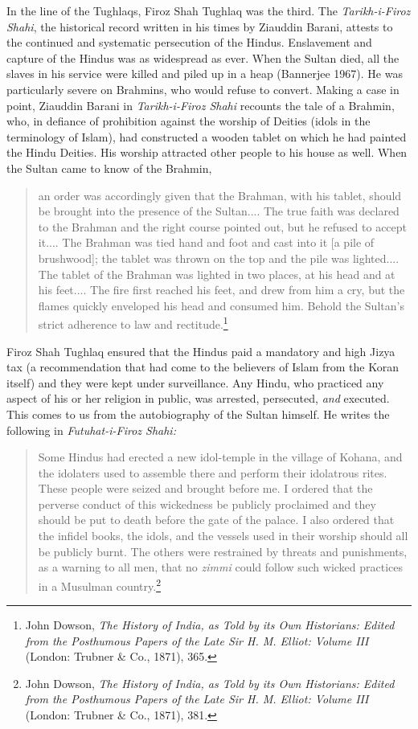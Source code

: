In the line of the Tughlaqs, Firoz Shah Tughlaq was the third. The \textit{Tarikh-i-Firoz Shahi}, the historical record written in his times by Ziauddin Barani, attests to the continued and systematic persecution of the Hindus. Enslavement and capture of the Hindus was as widespread as ever. When the Sultan died, all the slaves in his service were killed and piled up in a heap (Bannerjee 1967). He was particularly severe on Brahmins, who would refuse to convert. Making a case in point, Ziauddin Barani in \textit{Tarikh-i-Firoz Shahi} recounts the tale of a Brahmin, who, in defiance of prohibition against the worship of Deities (idols in the terminology of Islam), had constructed a wooden tablet on which he had painted the Hindu Deities. His worship attracted other people to his house as well. When the Sultan came to know of the Brahmin,
\begin{quote}
an order was accordingly given that the Brahman, with his tablet, should be brought into the presence of the Sultan.... The true faith was declared to the Brahman and the right course pointed out, but he refused to accept it.... The Brahman was tied hand and foot and cast into it [a pile of brushwood]; the tablet was thrown on the top and the pile was lighted.... The tablet of the Brahman was lighted in two places, at his head and at his feet.... The fire first reached his feet, and drew from him a cry, but the flames quickly enveloped his head and consumed him. Behold the Sultan's strict adherence to law and rectitude.\footnote{John Dowson, \textit{The History of India, as Told by its Own Historians: Edited from the Posthumous Papers of the Late Sir H. M. Elliot: Volume III} (London: Trubner \& Co., 1871), 365.}
\end{quote}
Firoz Shah Tughlaq ensured that the Hindus paid a mandatory and high Jizya tax (a recommendation that had come to the believers of Islam from the Koran itself) and they were kept under surveillance. Any Hindu, who practiced any aspect of his or her religion in public, was arrested, persecuted, \textit{and} executed. This comes to us from the autobiography of the Sultan himself. He writes the following in \textit{Futuhat-i-Firoz Shahi:} 
\begin{quote}
Some Hindus had erected a new idol-temple in the village of Kohana, and the idolaters used to assemble there and perform their idolatrous rites. These people were seized and brought before me. I ordered that the perverse conduct of this wickedness be publicly proclaimed and they should be put to death before the gate of the palace. I also ordered that the infidel books, the idols, and the vessels used in their worship should all be publicly burnt. The others were restrained by threats and punishments, as a warning to all men, that no \textit{zimmi} could follow such wicked practices in a Musulman country.\footnote{John Dowson, \textit{The History of India, as Told by its Own Historians: Edited from the Posthumous Papers of the Late Sir H. M. Elliot: Volume III} (London: Trubner \& Co., 1871), 381.}
\end{quote}
